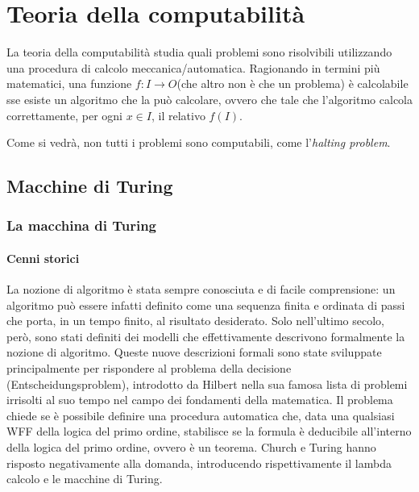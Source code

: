 \chapter{Teoria della computabilità}
La teoria della computabilità studia quali problemi sono risolvibili utilizzando una procedura di calcolo meccanica/automatica.
Ragionando in termini più matematici, una funzione $f: I \rightarrow O$(che altro non è che un problema) è calcolabile sse esiste un algoritmo che la può calcolare, ovvero che tale che l'algoritmo calcola correttamente, per ogni $x \in I$, il relativo $f(I)$.

Come si vedrà, non tutti i problemi sono computabili, come l'\textit{halting problem}.

\section{Macchine di Turing}
\subsection*{La macchina di Turing}
\subsubsection*{Cenni storici}
La nozione di algoritmo è stata sempre conosciuta e di facile comprensione: un algoritmo può essere infatti definito come una sequenza finita e ordinata di passi che porta, in un tempo finito, al risultato desiderato.
Solo nell'ultimo secolo, però, sono stati definiti dei modelli che effettivamente descrivono formalmente la nozione di algoritmo. Queste nuove descrizioni formali sono state sviluppate principalmente per rispondere al problema della decisione (Entscheidungsproblem), introdotto da Hilbert nella sua famosa lista di problemi irrisolti al suo tempo nel campo dei fondamenti della matematica. Il problema chiede se è possibile definire una procedura automatica che, data una qualsiasi WFF della logica del primo ordine, stabilisce se la formula è deducibile all'interno della logica del primo ordine, ovvero è un teorema. Church e Turing hanno risposto negativamente alla domanda, introducendo rispettivamente il lambda calcolo e le macchine di Turing.

